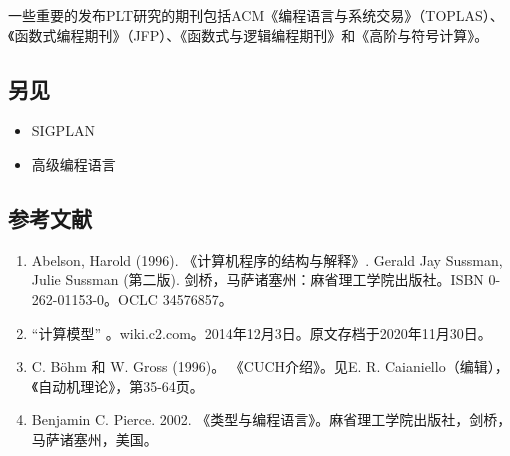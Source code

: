一些重要的发布PLT研究的期刊包括ACM《编程语言与系统交易》（TOPLAS）、《函数式编程期刊》（JFP）、《函数式与逻辑编程期刊》和《高阶与符号计算》。
\subsection{另见}  
\begin{itemize}
\item SIGPLAN  
\item 高级编程语言
\end{itemize}
\subsection{参考文献}  
\begin{enumerate}
\item Abelson, Harold (1996). 《计算机程序的结构与解释》. Gerald Jay Sussman, Julie Sussman (第二版). 剑桥，马萨诸塞州：麻省理工学院出版社。ISBN 0-262-01153-0。OCLC 34576857。  
\item “计算模型” 。wiki.c2.com。2014年12月3日。原文存档于2020年11月30日。  
\item C. Böhm 和 W. Gross (1996)。 《CUCH介绍》。见E. R. Caianiello（编辑），《自动机理论》，第35-64页。  
\item Benjamin C. Pierce. 2002. 《类型与编程语言》。麻省理工学院出版社，剑桥，马萨诸塞州，美国。
\end{enumerate}
